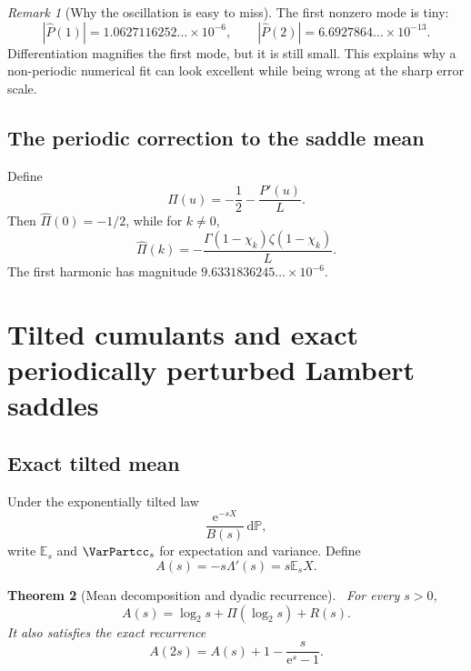 \documentclass[11pt]{article}
\numberwithin{equation}{section}
\newtheorem{theorem}{Theorem}[section]
\theoremstyle{definition}
\theoremstyle{remark}
\newtheorem{remark}[theorem]{Remark}
\newcommand{\E}{\mathbb E}
\newcommand{\Prob}{\mathbb P}
\newcommand{\dd}{\,\mathrm d}
\newcommand{\e}{\mathrm e}
\begin{document}
\begin{remark}[Why the oscillation is easy to miss]
The first nonzero mode is tiny:
\[
 |\widehat P(1)|=1.0627116252\ldots\times10^{-6},\qquad
 |\widehat P(2)|=6.6927864\ldots\times10^{-13}.
\]
Differentiation magnifies the first mode, but it is still small.  This explains why a
non-periodic numerical fit can look excellent while being wrong at the sharp error scale.
\end{remark}

\subsection{The periodic correction to the saddle mean}
Define
\begin{equation}
 \Pi(u)=-\frac12-\frac{P'(u)}L.                             \label{p9:eq:Pi}
\end{equation}
Then $\widehat\Pi(0)=-1/2$, while for $k\ne0$,
\begin{equation}
 \boxed{
 \widehat\Pi(k)=-\frac{\Gamma(1-\chi_k)\zeta(1-\chi_k)}L.} \label{p9:eq:Pi-Fourier}
\end{equation}
The first harmonic has magnitude $9.6331836245\ldots\times10^{-6}$.

\section{Tilted cumulants and exact periodically perturbed Lambert saddles}
\label{p9:sec:saddle}

\subsection{Exact tilted mean}
Under the exponentially tilted law
\[
 \frac{\e^{-sX}}{B(s)}\dd\Prob,
\]
write $\E_s$ and $\VarPartcc_s$ for expectation and variance.  Define
\begin{equation}
 A(s)=-s\Lambda'(s)=s\E_sX.                                \label{p9:eq:A}
\end{equation}

\begin{theorem}[Mean decomposition and dyadic recurrence]\label{p9:thm:A-decomp}
\statusN\ For every $s>0$,
\begin{equation}
 \boxed{A(s)=\log_2s+\Pi(\log_2s)+R(s).}                   \label{p9:eq:A-decomp}
\end{equation}
It also satisfies the exact recurrence
\begin{equation}
 \boxed{A(2s)=A(s)+1-\frac{s}{\e^s-1}.}                    \label{p9:eq:A-recurrence}
\end{equation}
\end{theorem}
\end{document}
